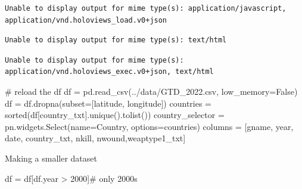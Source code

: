 \documentclass[
  letterpaper,
  DIV=11,
  numbers=noendperiod]{scrreprt}
\newenvironment{Shaded}{\begin{snugshade}}{\end{snugshade}}
\newcommand{\BuiltInTok}[1]{\textcolor[rgb]{0.00,0.23,0.31}{#1}}
\newcommand{\CommentTok}[1]{\textcolor[rgb]{0.37,0.37,0.37}{#1}}
\newcommand{\DecValTok}[1]{\textcolor[rgb]{0.68,0.00,0.00}{#1}}
\newcommand{\NormalTok}[1]{\textcolor[rgb]{0.00,0.23,0.31}{#1}}
\newcommand{\OperatorTok}[1]{\textcolor[rgb]{0.37,0.37,0.37}{#1}}
\newcommand{\StringTok}[1]{\textcolor[rgb]{0.13,0.47,0.30}{#1}}
\newcommand{\VariableTok}[1]{\textcolor[rgb]{0.07,0.07,0.07}{#1}}
\begin{document}
\begin{verbatim}
Unable to display output for mime type(s): application/javascript, application/vnd.holoviews_load.v0+json
\end{verbatim}

\begin{verbatim}
Unable to display output for mime type(s): text/html
\end{verbatim}

\begin{verbatim}
Unable to display output for mime type(s): application/vnd.holoviews_exec.v0+json, text/html
\end{verbatim}

\begin{Shaded}
\begin{Highlighting}[]
\CommentTok{\# reload the df}
\NormalTok{df }\OperatorTok{=}\NormalTok{ pd.read\_csv(}\StringTok{\textquotesingle{}../data/GTD\_2022.csv\textquotesingle{}}\NormalTok{, low\_memory}\OperatorTok{=}\VariableTok{False}\NormalTok{)}
\NormalTok{df }\OperatorTok{=}\NormalTok{ df.dropna(subset}\OperatorTok{=}\NormalTok{[}\StringTok{\textquotesingle{}latitude\textquotesingle{}}\NormalTok{, }\StringTok{\textquotesingle{}longitude\textquotesingle{}}\NormalTok{])}
\NormalTok{countries }\OperatorTok{=} \BuiltInTok{sorted}\NormalTok{(df[}\StringTok{\textquotesingle{}country\_txt\textquotesingle{}}\NormalTok{].unique().tolist())}
\NormalTok{country\_selector }\OperatorTok{=}\NormalTok{ pn.widgets.Select(name}\OperatorTok{=}\StringTok{\textquotesingle{}Country\textquotesingle{}}\NormalTok{, options}\OperatorTok{=}\NormalTok{countries)}
\NormalTok{columns }\OperatorTok{=}\NormalTok{ [}\StringTok{\textquotesingle{}gname\textquotesingle{}}\NormalTok{, }\StringTok{\textquotesingle{}year\textquotesingle{}}\NormalTok{, }\StringTok{\textquotesingle{}date\textquotesingle{}}\NormalTok{, }\StringTok{\textquotesingle{}country\_txt\textquotesingle{}}\NormalTok{, }\StringTok{\textquotesingle{}nkill\textquotesingle{}}\NormalTok{, }\StringTok{\textquotesingle{}nwound\textquotesingle{}}\NormalTok{,}\StringTok{\textquotesingle{}weaptype1\_txt\textquotesingle{}}\NormalTok{]}
\end{Highlighting}
\end{Shaded}

Making a smaller dataset

\begin{Shaded}
\begin{Highlighting}[]
\NormalTok{df }\OperatorTok{=}\NormalTok{ df[df.year }\OperatorTok{\textgreater{}} \DecValTok{2000}\NormalTok{]}\CommentTok{\# only 2000s}
\end{Highlighting}
\end{Shaded}
\end{document}
